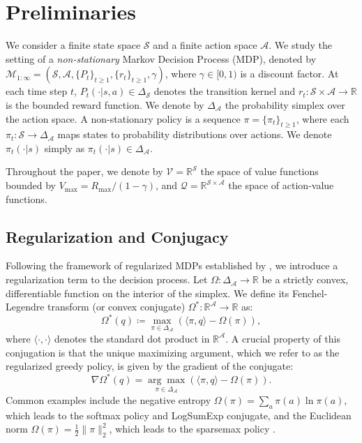 \documentclass{article}
\theoremstyle{plain}
\theoremstyle{definition}
\theoremstyle{remark}
\newcommand{\1}{\mathbbm{1}}
\newcommand{\R}{\mathbb{R}}
\newcommand{\Sspace}{\mathcal{S}}
\newcommand{\Aspace}{\mathcal{A}}
\newcommand{\M}{\mathcal{M}}
\newcommand{\Simplex}{\Delta_{\Aspace}}
\newcommand{\inner}[2]{\langle #1, #2 \rangle}
\begin{document}
\section{Preliminaries}
\label{sec:preliminaries}

We consider a finite state space $\Sspace$ and a finite action space $\Aspace$. We study the setting of a \textit{non-stationary} Markov Decision Process (MDP), denoted by $\M_{1:\infty} = (\Sspace, \Aspace, \{P_t\}_{t \ge 1}, \{r_t\}_{t \ge 1}, \gamma)$, where $\gamma \in [0, 1)$ is a discount factor. At each time step $t$, $P_t(\cdot|s, a) \in \Delta_{\Sspace}$ denotes the transition kernel and $r_t: \Sspace \times \Aspace \to \R$ is the bounded reward function.
We denote by $\Delta_{\Aspace}$ the probability simplex over the action space. A non-stationary policy is a sequence $\pi = \{\pi_t\}_{t \ge 1}$, where each $\pi_t: \Sspace \to \Delta_{\Aspace}$ maps states to probability distributions over actions. We denote $\pi_t(\cdot|s)$ simply as $\pi_t(\cdot|s) \in \Simplex$.

Throughout the paper, we denote by $\mathcal{V} = \R^\Sspace$ the space of value functions bounded by $V_{\max} = R_{\max}/(1-\gamma)$, and $\mathcal{Q} = \R^{\Sspace \times \Aspace}$ the space of action-value functions.

\subsection{Regularization and Conjugacy}
Following the framework of regularized MDPs established by \cite{geist2019theory}, we introduce a regularization term to the decision process. Let $\Omega: \Simplex \to \R$ be a strictly convex, differentiable function on the interior of the simplex. We define its Fenchel-Legendre transform (or convex conjugate) $\Omega^*: \R^\Aspace \to \R$ as:
\begin{equation}
    \Omega^*(q) \coloneqq \max_{\pi \in \Simplex} \left( \inner{\pi}{q} - \Omega(\pi) \right),
\end{equation}
where $\inner{\cdot}{\cdot}$ denotes the standard dot product in $\R^\Aspace$. A crucial property of this conjugation is that the unique maximizing argument, which we refer to as the regularized greedy policy, is given by the gradient of the conjugate:
\begin{equation}
    \nabla \Omega^*(q) = \underset{\pi \in \Simplex}{\arg\max} \left( \inner{\pi}{q} - \Omega(\pi) \right).
\end{equation}
Common examples include the negative entropy $\Omega(\pi) = \sum_a \pi(a) \ln \pi(a)$, which leads to the softmax policy and LogSumExp conjugate, and the Euclidean norm $\Omega(\pi) = \frac{1}{2}\|\pi\|_2^2$, which leads to the sparsemax policy \cite{martins2016softmax}.
\end{document}
